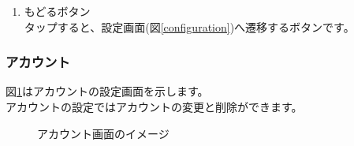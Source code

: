 \documentclass[a4j]{jarticle}
\begin{document}
\begin{enumerate}
  \renewcommand{\labelenumi}{\textcircled{\scriptsize \theenumi}}
\item もどるボタン\\
  タップすると、設定画面(図\ref{configuration})へ遷移するボタンです。
\end{enumerate}

\newpage
\subsubsection{アカウント}
図\ref{account}はアカウントの設定画面を示します。\\
アカウントの設定ではアカウントの変更と削除ができます。

\begin{figure}[H]
    \begin{center}
    \caption {アカウント画面のイメージ}
    \label{account}
    \end{center}
\end{figure}
\end{document}
